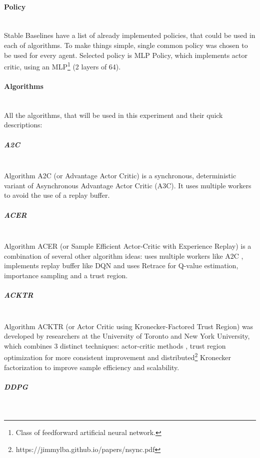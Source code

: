 \documentclass[12pt, a4paper]{article}
\begin{document}
\paragraph{Policy}\mbox{}\\

Stable Baselines have a list of already implemented policies, that could be used in each of algorithms. To make things simple, single common policy was chosen to be used for every agent. Selected policy is MLP Policy, which implements actor critic, using an MLP\footnote{Class of feedforward artificial neural network.} (2 layers of 64).

\paragraph{Algorithms}\mbox{}\\

All the algorithms, that will be used in this experiment and their quick descriptions:

\subparagraph{A2C}\mbox{}\\

Algorithm A2C (or Advantage Actor Critic) \cite{mnih:2016} is a synchronous, deterministic variant of Asynchronous Advantage Actor Critic (A3C). It uses multiple workers to avoid the use of a replay buffer.

\subparagraph{ACER}\mbox{}\\

Algorithm ACER (or Sample Efficient Actor-Critic with Experience Replay) \cite{wang:2016} is a combination of several other algorithm ideas: uses multiple workers like A2C \cite{mnih:2016}, implements replay buffer like DQN \cite{mnih:2013} and uses Retrace \cite{munos:2016} for Q-value estimation, importance sampling and a trust region.

\subparagraph{ACKTR}\mbox{}\\

Algorithm ACKTR (or Actor Critic using Kronecker-Factored Trust Region) \cite{wu:2017} was developed by researchers at the University of Toronto and New York University, which combines 3 distinct techniques: actor-critic methods \cite{mnih:2016}, trust region optimization \cite{schulman:2015} for more consistent improvement and distributed\footnote{https://jimmylba.github.io/papers/nsync.pdf} Kronecker factorization \cite{grosse:2016} to improve sample efficiency and scalability.

\subparagraph{DDPG}\mbox{}\\
\end{document}
